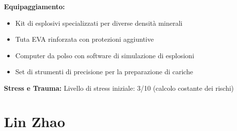 \documentclass[11pt,a4paper]{article}
\begin{document}
\begin{tcolorbox}[colback=mininglightorange!20, colframe=miningorange]
\textbf{Equipaggiamento:}
\begin{itemize}[leftmargin=*]
\item Kit di esplosivi specializzati per diverse densità minerali
\item Tuta EVA rinforzata con protezioni aggiuntive
\item Computer da polso con software di simulazione di esplosioni
\item Set di strumenti di precisione per la preparazione di cariche
\end{itemize}

\textbf{Stress e Trauma:} Livello di stress iniziale: 3/10 (calcolo costante dei rischi)
\end{tcolorbox}

\section{Lin Zhao}
\end{document}
